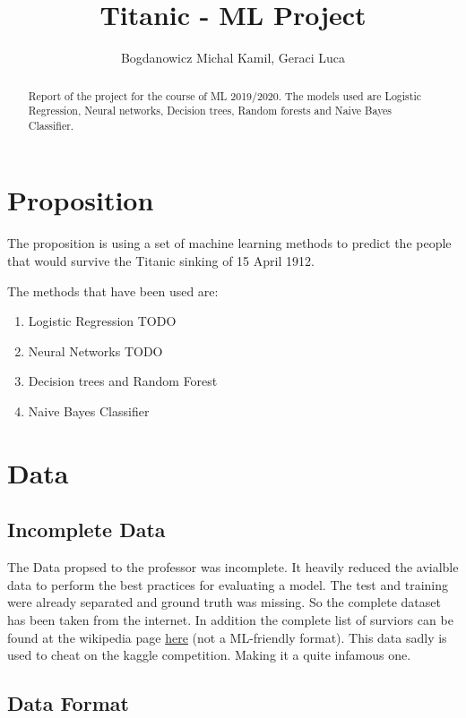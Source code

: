 \documentclass{article}
\begin{document}
\title{Titanic - ML Project}
\author{Bogdanowicz Michal Kamil, Geraci Luca}

\maketitle

\begin{abstract}
Report of the project for the course of ML 2019/2020.
\break The models used are Logistic Regression, Neural networks, Decision trees, Random forests and Naive Bayes Classifier.
\end{abstract}


\section{Proposition}
The proposition is using a set of machine learning methods to predict the people that would survive the Titanic sinking of 15 April 1912.

The methods that have been used are:

\begin{enumerate}  
\item Logistic Regression TODO
\item Neural Networks TODO
\item Decision trees and Random Forest
\item Naive Bayes Classifier
\end{enumerate}

\section{Data}
\subsection{Incomplete Data}

The Data propsed to the professor was incomplete. It heavily reduced the avialble data to perform the best practices for evaluating a model. The test and training were already separated and ground truth was missing. So the complete dataset has been taken from the internet. In addition the complete list of surviors can be found at the wikipedia page \href{https://en.wikipedia.org/wiki/Passengers_of_the_RMS_Titanic}{here} (not a ML-friendly format).
This data sadly is used to cheat on the kaggle competition. Making it a quite infamous one.

\subsection{Data Format}
\end{document}
